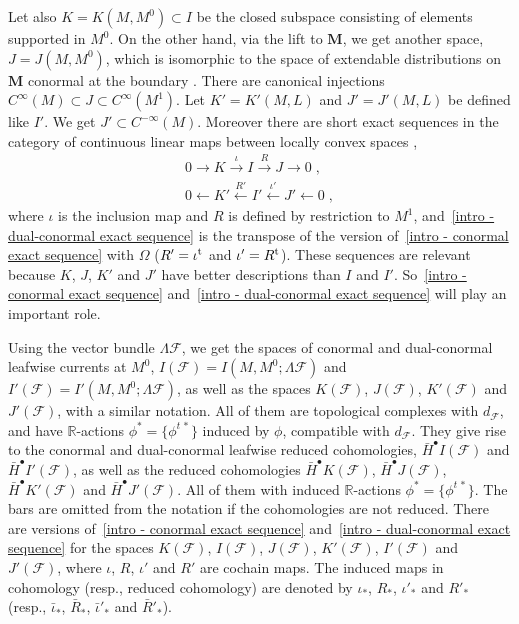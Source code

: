 \documentclass{memo-l}
\theoremstyle{plain}
\theoremstyle{definition}
\theoremstyle{remark}
\newcommand{\R}{\mathbb{R}}
\newcommand{\FF}{\mathcal{F}}
\newcommand{\bfM}{\boldsymbol{M}}
\newcommand{\trans}{{\text{\rm t}}}
\numberwithin{section}{chapter}
\numberwithin{equation}{section}%
\begin{document}
Let also $K=K(M,M^0)\subset I$ be the closed subspace consisting of elements supported in $M^0$. On the other hand, via the lift to $\bfM$, we get another space, $J=J(M,M^0)$, which is isomorphic to the space of extendable distributions on $\bfM$ conormal at the boundary \cite[Chapter~4]{Melrose1996}. There are canonical injections $C^\infty(M)\subset J\subset C^\infty(M^1)$. Let $K'=K'(M,L)$ and $J'=J'(M,L)$ be defined like $I'$. We get $J'\subset C^{-\infty}(M)$. Moreover there are short exact sequences in the category of continuous linear maps between locally convex spaces \cite[Chapter~2]{Wengenroth2003},
\begin{gather}
0\to K \xrightarrow{\iota} I \xrightarrow{R} J\to0\;,\label{intro - conormal exact sequence}\\
0\leftarrow K' \xleftarrow{R'} I' \xleftarrow{\iota'} J'\leftarrow0\;,
\label{intro - dual-conormal exact sequence}
\end{gather}
where $\iota$ is the inclusion map and $R$ is defined by restriction to $M^1$, and~\eqref{intro - dual-conormal exact sequence} is the transpose of the version of~\eqref{intro - conormal exact sequence} with $\Omega$ ($R'=\iota^\trans$ and $\iota'=R^\trans$). These sequences are relevant because $K$, $J$, $K'$ and $J'$ have better descriptions than $I$ and $I'$. So~\eqref{intro - conormal exact sequence} and~\eqref{intro - dual-conormal exact sequence} will play an important role.

Using the vector bundle $\Lambda\FF$, we get the spaces of conormal and dual-conormal leafwise currents at $M^0$, $I(\FF)=I(M,M^0;\Lambda\FF)$ and $I'(\FF)=I'(M,M^0;\Lambda\FF)$, 
as well as the spaces $K(\FF)$, $J(\FF)$, $K'(\FF)$ and $J'(\FF)$, with a similar notation. All of them are topological complexes with $d_\FF$, and have $\R$-actions $\phi^*=\{\phi^{t\,*}\}$ induced by $\phi$, compatible with $d_\FF$. They give rise to the conormal and dual-conormal leafwise reduced cohomologies, $\bar H^\bullet I(\FF)$ and $\bar H^\bullet I'(\FF)$, as well as the reduced cohomologies $\bar H^\bullet K(\FF)$, $\bar H^\bullet J(\FF)$, $\bar H^\bullet K'(\FF)$ and $\bar H^\bullet J'(\FF)$. All of them with induced $\R$-actions $\phi^*=\{\phi^{t\,*}\}$. The bars are omitted from the notation if the cohomologies are not reduced. There are versions of~\eqref{intro - conormal exact sequence} and~\eqref{intro - dual-conormal exact sequence} for the spaces $K(\FF)$, $I(\FF)$, $J(\FF)$, $K'(\FF)$, $I'(\FF)$ and $J'(\FF)$, where $\iota$, $R$, $\iota'$ and $R'$ are cochain maps. The induced maps in cohomology (resp., reduced cohomology) are denoted by $\iota_*$, $R_*$, $\iota'_*$ and $R'_*$ (resp., $\bar\iota_*$, $\bar R_*$, $\bar\iota'_*$ and $\bar R'_*$). 
\end{document}
